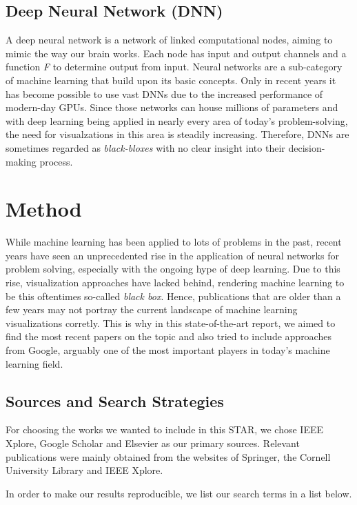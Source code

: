 \documentclass{acmsiggraph}               %
\begin{document}
\subsection{Deep Neural Network (DNN)}
A deep neural network is a network of linked computational nodes, aiming to mimic the way our brain works. Each node has input and output channels and a function \textit{F} to determine output from input. Neural networks are a sub-category of machine learning that build upon its basic concepts. Only in recent years it has become possible to use vast DNNs due to the increased performance of modern-day GPUs. Since those networks can house millions of parameters and with deep learning being applied in nearly every area of today's problem-solving, the need for visualzations in this area is steadily increasing. Therefore, DNNs are sometimes regarded as \textit{black-bloxes} with no clear insight into their decision-making process.


\section{Method}
While machine learning has been applied to lots of problems in the past, recent years have seen an unprecedented rise in the application of neural networks for problem solving, especially with the ongoing hype of deep learning. Due to this rise, visualization approaches have lacked behind, rendering machine learning to be this oftentimes so-called \textit{black box}. Hence, publications that are older than a few years may not portray the current landscape of machine learning visualizations corretly. This is why in this state-of-the-art report, we aimed to find the most recent papers on the topic and also tried to include approaches from Google, arguably one of the most important players in today's machine learning field.

\subsection{Sources and Search Strategies}
For choosing the works we wanted to include in this STAR, we chose IEEE Xplore, Google Scholar and Elsevier as our primary sources. Relevant publications were mainly obtained from the websites of Springer, the Cornell University Library and IEEE Xplore.

In order to make our results reproducible, we list our search terms in a list below.
\end{document}
